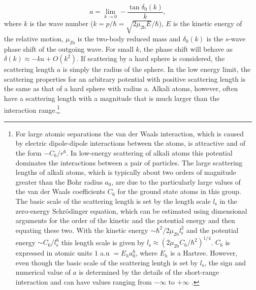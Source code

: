 \begin{equation} \label{eq:2}
a = \lim_{k \to 0} -\frac{\tan\delta_0(k)}{k},
\end{equation}
where $k$ is the wave number ($k=p/\hbar = \sqrt{2\mu_{2\mathrm{b}} E}/\hbar$), $E$ is the kinetic energy of the relative motion, $\mu_{2\mathrm{b}}$ is the two-body reduced mass and $\delta_0(k)$ is the $s$-wave phase shift of the outgoing wave. For small $k$, the phase shift will behave as $\delta(k)\approx-ka + O(k^2)$. If scattering by a hard sphere is considered, the scattering length $a$ is simply the radius of the sphere. In the low energy limit, the scattering properties for an arbitrary potential with positive scattering length is the same as that of a hard sphere with radius a. Alkali atoms, however, often have a scattering length with a magnitude that is much larger than the interaction range.\footnote{For large atomic separations the van der Waals interaction, which is caused by electric dipole-dipole interactions between the atoms, is attractive and of the form $-C_6/r^6$. In low-energy scattering of alkali atoms this potential dominates the interactions between a pair of particles. The large scattering lengths of alkali atoms, which is typically about two orders of magnitude greater than the Bohr radius $a_0$, are due to the particularly large values of the van der Waals coefficients $C_6$ for the ground state atoms in this group. The basic scale of the scattering length is set by the length scale $l_{\mathrm{s}}$ in the zero-energy Schr{\"o}dinger equation, which can be estimated using dimensional arguments for the order of the kinetic and the potential energy and then equating these two. With the kinetic energy $ \sim \hbar^2/2\mu_{2\mathrm{b}}l_{\mathrm{s}}^2$ and the potential energy $ \sim C_6/l_{\mathrm{s}}^6$ this length scale is given by $l_{\mathrm{s}} \approx (2\mu_{2\mathrm{b}} C_6/\hbar^2)^{1/4}$. $C_6$ is expressed in atomic units $1$ a.u $=E_h a_0^6$, where $E_h$ is a Hartree. However, even though the basic scale of the scattering lentgh is set by $l_{\mathrm{s}}$, the sign and numerical value of $a$ is determined by the details of the short-range interaction and can have values ranging from $-\infty$ to $+\infty$ \cite{pethick_smith_2008}.} 
